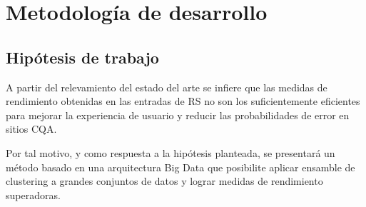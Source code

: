 \newpage \section{Metodología de desarrollo} \label{ch:metodologia}
\subsection{Hipótesis de trabajo}
\noindent A partir del relevamiento del estado del arte se infiere que las medidas de rendimiento obtenidas en las entradas de RS no son los suficientemente eficientes para mejorar la experiencia de usuario y reducir las probabilidades de error en sitios CQA.

\bigskip Por tal motivo, y como respuesta a la hipótesis planteada, se presentará un método basado en una arquitectura Big Data que posibilite aplicar ensamble de clustering a grandes conjuntos de datos y lograr medidas de rendimiento superadoras.

